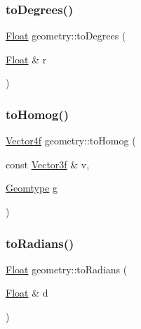 \mbox{\label{namespacegeometry_a06c175e49959597cbc93635c41ecbf98}} 
\subsubsection{\texorpdfstring{toDegrees()}{toDegrees()}}
{\footnotesize\ttfamily \mbox{\hyperlink{cyclop_8hpp_a07afd7094cb489cbd514c76e6f55d34f}{Float}} geometry\+::to\+Degrees (\begin{DoxyParamCaption}\item[{\mbox{\hyperlink{cyclop_8hpp_a07afd7094cb489cbd514c76e6f55d34f}{Float}} \&}]{r }\end{DoxyParamCaption})}

\mbox{\label{namespacegeometry_a2550fb39f65597df7df21efac9e8a130}} 
\subsubsection{\texorpdfstring{toHomog()}{toHomog()}}
{\footnotesize\ttfamily \mbox{\hyperlink{cyclop_8hpp_ac277e3b99e79f681e1e8b633243a9abf}{Vector4f}} geometry\+::to\+Homog (\begin{DoxyParamCaption}\item[{const \mbox{\hyperlink{cyclop_8hpp_a5a0a2e85b081623ef3f7e7e8d43024f5}{Vector3f}} \&}]{v,  }\item[{\mbox{\hyperlink{cyclop_8hpp_a2317999143a1598860004551163419b5}{Geomtype}}}]{g }\end{DoxyParamCaption})}

\mbox{\label{namespacegeometry_a762bd0745396732f10b428ed2bf1a9c5}} 
\subsubsection{\texorpdfstring{toRadians()}{toRadians()}}
{\footnotesize\ttfamily \mbox{\hyperlink{cyclop_8hpp_a07afd7094cb489cbd514c76e6f55d34f}{Float}} geometry\+::to\+Radians (\begin{DoxyParamCaption}\item[{\mbox{\hyperlink{cyclop_8hpp_a07afd7094cb489cbd514c76e6f55d34f}{Float}} \&}]{d }\end{DoxyParamCaption})}

